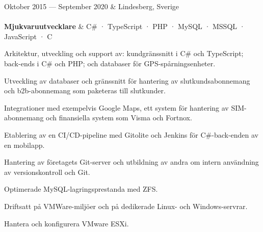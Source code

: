 \documentclass{cv-stylish}
\begin{document}
\begin{center}
\vspace{1em}
\begin{JobTable}
  Oktober 2015 --- September 2020 & \hfill Lindesberg, Sverige \\[3pt]
   \\[3pt]
  \hspace{5mm} \textbf{Mjukvaruutvecklare}
  & \hfill C\# · TypeScript · PHP · MySQL · MSSQL · JavaScript · C \\
\end{JobTable}
\begin{adjustwidth}{0.015\linewidth}{0.015\linewidth}

\begin{compactitem}
  \item Arkitektur, utveckling och support av: kundgränssnitt i
    C\# och TypeScript; back-ends i C\# och PHP; och databaser för
    GPS-spårningsenheter.
  \item Utveckling av databaser och gränssnitt för hantering av
    slutkundsabonnemang och b2b-abonnemang som paketeras till slutkunder.
  \item Integrationer med exempelvis Google Maps, ett system för hantering
    av SIM-abonnemang och finansiella system som Visma och Fortnox.
  \item Etablering av en CI/CD-pipeline med Gitolite och Jenkins för C\#-back-enden av en mobilapp.
  \item Hantering av företagets Git-server och utbildning av andra om
    intern användning av versionskontroll och Git.
  \item Optimerade MySQL-lagringsprestanda med ZFS.
  \item Driftsatt på VMWare-miljöer och på dedikerade Linux- och
    Windows-servrar.
  \item Hantera och konfigurera VMware ESXi.
\end{compactitem}
\end{adjustwidth}


\end{center}
\end{document}
